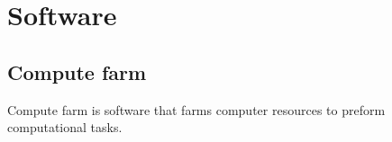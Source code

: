 \chapter{Software}
\label{methods}
\section{Compute farm}

Compute farm is software that farms computer resources to preform computational tasks. 
